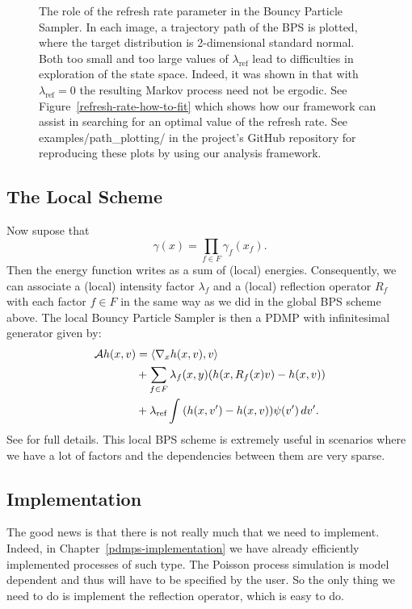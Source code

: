 \documentclass[report.tex]{subfiles}
\begin{document}
\begin{figure}
  \caption{The role of the refresh rate parameter in the Bouncy Particle Sampler.
           In each image, a trajectory path of the BPS is plotted, where
           the target distribution is 2-dimensional standard normal.
           Both too small and too large values of $\lambda_{\text{ref}}$ lead to
           difficulties in exploration of the state space. Indeed, it was shown
           in \citet{bouchard2015bouncy} that with $\lambda_{\text{ref}} = 0$ the
           resulting Markov process need not be ergodic.
           See Figure~\ref{refresh-rate-how-to-fit} which shows how our framework
           can assist in searching for an optimal value of the refresh rate.
           See examples/path\_plotting/ in the project's GitHub repository for
           reproducing these plots by using our analysis framework.}
  \label{image-bps-refresh-rates}
\end{figure}

\subsection{The Local Scheme}

Now supose that
$$
\gamma(x) = \prod_{f \in F} \gamma_{f}(x_{f}).
$$
Then the energy function writes as a sum of (local) energies.
Consequently, we can associate a (local) intensity factor $\lambda_{f}$ and a (local) reflection
operator $R_{f}$ with each factor $f \in F$ in the same way as we did in the global BPS scheme above.
The local Bouncy Particle Sampler is then a PDMP with infinitesimal generator given by:
\begin{align*}
  \mathcal{A}h(x, v) &= \langle \nabla_{x} h(x, v), v\rangle \\
                     &+ \sum_{f \in F} \lambda_{f}(x, y)(h(x, R_{f}(x)v) - h(x, v)) \\
                     &+ \lambda_{\text{ref}} \int_{{}}^{{}} {(h(x, v') - h(x, v))\psi(v')}\, d{v'}.
\end{align*}
See \cite{bouchard2015bouncy} for full details. This local BPS scheme is extremely useful
in scenarios where we have a lot of factors and the dependencies between them are very
sparse.

\subsection{Implementation}
The good news is that there is not really much that we need to implement.
Indeed, in Chapter~\ref{pdmps-implementation} we have already efficiently implemented
processes of such type.
The Poisson process simulation is model dependent and thus will have to be specified by the user.
So the only thing we need to do is implement the reflection operator, which is easy to do.
\end{document}
